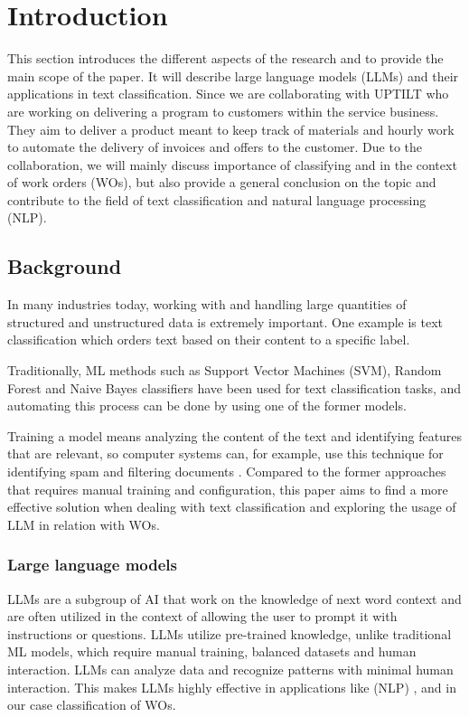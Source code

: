 \section{Introduction}

This section introduces the different aspects of the research and to provide the
main scope of the paper.
It will describe large language models (LLMs) and their applications in text
classification.
Since we are collaborating with UPTILT who are working on delivering a program
to customers within the service
business.
They aim to deliver a product meant to keep track of materials and hourly work
to automate the delivery of invoices and offers to the customer.
Due to the collaboration, we will mainly discuss importance of classifying
and in the context of work orders (WOs), but also provide a general conclusion
on the topic and contribute to the field of text classification and natural
language processing (NLP).

\subsection{Background}

In many industries today, working with and handling large quantities of
structured and unstructured data is extremely important.
One example is text classification which orders text based on their content to a
specific label.

Traditionally, ML methods such as Support Vector Machines (SVM), Random Forest
and Naive Bayes classifiers have been used for text classification tasks,
and automating this process can be done by using one of the former models.

Training a model means analyzing the content of the text and identifying
features that are relevant, so computer systems can, for example, use this
technique for identifying spam and filtering documents \cite{dalal2011}.
Compared to the former approaches that requires manual training and
configuration, this paper aims to find a more effective solution when dealing
with text classification and exploring the usage of LLM in relation with WOs.

\subsubsection{Large language models}

LLMs are a subgroup of AI that work on the knowledge of next word context and
are often utilized in the context of allowing the user to prompt it with
instructions or questions.
LLMs utilize pre-trained knowledge, unlike traditional ML models, which require
manual training, balanced datasets and human interaction.
LLMs can analyze data and recognize patterns with minimal human interaction.
This makes LLMs highly effective in applications like (NLP)
\cite{andersson2024}, and in our case classification of WOs.

